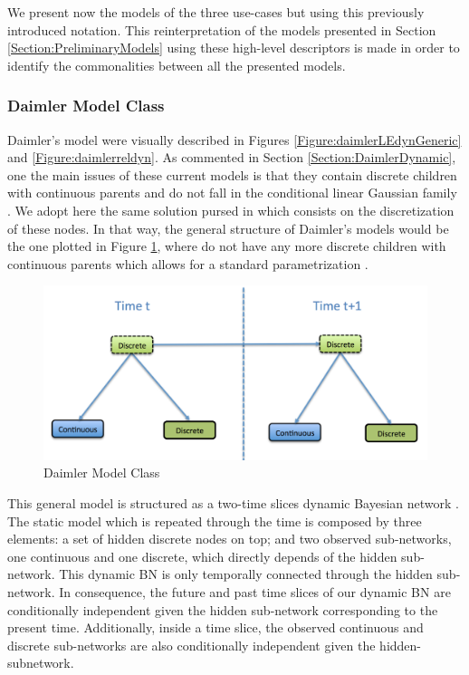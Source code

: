 We present now the models of the three use-cases but using this previously introduced notation. This reinterpretation of the models presented in Section \ref{Section:PreliminaryModels} using these high-level descriptors is made in order to identify the commonalities between all the presented models. 

\subsubsection*{Daimler Model Class}

Daimler's model were visually described in Figures \ref{Figure:daimlerLEdynGeneric}  and \ref{Figure:daimlerreldyn}. As commented in Section \ref{Section:DaimlerDynamic}, one the main issues of these current models is that they contain discrete children with continuous parents and do not fall in the conditional linear Gaussian family \cite{JensenNielsen2007}. We adopt here the same solution pursed in \cite{kasper2012object} which consists on the discretization of these nodes. In that way, the general structure of Daimler's models would be the one plotted in Figure \ref{Figure:DaimlerModelClass}, where do not have any more discrete children with continuous parents which allows for a standard parametrization \cite{JensenNielsen2007}. 

\begin{figure}
\begin{center}
\includegraphics[scale=0.4]{./figures/DaimlerModelClass}
\caption{\label{Figure:DaimlerModelClass} Daimler Model Class}
\end{center}
\end{figure}

This general model is structured as a two-time slices dynamic Bayesian network \cite{JensenNielsen2007}. The static model which is repeated through the time is composed by three elements: a set of hidden discrete nodes on top; and two observed sub-networks, one continuous and one discrete, which directly depends of the hidden sub-network. This dynamic BN is only temporally connected through the hidden sub-network.  In consequence, the future and past time slices of our dynamic BN are conditionally independent given the hidden sub-network corresponding to the present time. Additionally, inside a time slice, the observed continuous and discrete sub-networks are also conditionally independent given the hidden-subnetwork.


